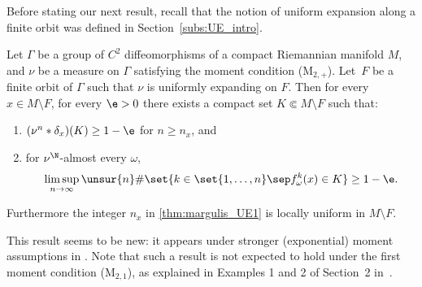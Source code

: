 Before stating our next result, recall that the notion of uniform expansion along a finite orbit was defined in Section~\ref{subs:UE_intro}.

\begin{thm}\label{thm:margulis_UE}
Let $\Gamma$ be a group of $C^2$ diffeomorphisms of a compact Riemannian
manifold $M$, and $\nu$ be a measure on
$\Gamma$ satisfying the moment condition (M$_{2,+}$).
Let~$F$ be a finite orbit of $\Gamma$ such that $\nu$ is uniformly expanding on $F$.
Then for every $x\in M\setminus F$, for every $\e>0$
there exists a compact set $K\Subset M\setminus F$ such that:
\begin{enumerate}
\item\label{thm:margulis_UE1} $(\nu^{n}\ast \delta_x) (K) \geq 1- \e$ for $n\geq n_x$, and
\item\label{thm:margulis_UE2} for $\nu^\N$-almost every $\omega$,
\[
\limsup_{n\to\infty} \unsur{n} \# \set{k\in \set{1, \ldots, n}\sep f^k_\omega(x) \in K} \geq 1-\e.
\]
\end{enumerate}
Furthermore the integer $n_x$ in \eqref{thm:margulis_UE1} is locally uniform in $M\setminus F$.
\end{thm}

This result seems to be new: it appears under stronger (exponential) moment assumptions
in \eg \cite{liu_thesis, chung}. Note that such a result is not expected to hold under the
first moment condition (M$_{2, 1}$), as explained in
Examples 1 and 2 of Section~2 in~\cite{benard-desaxce}.

